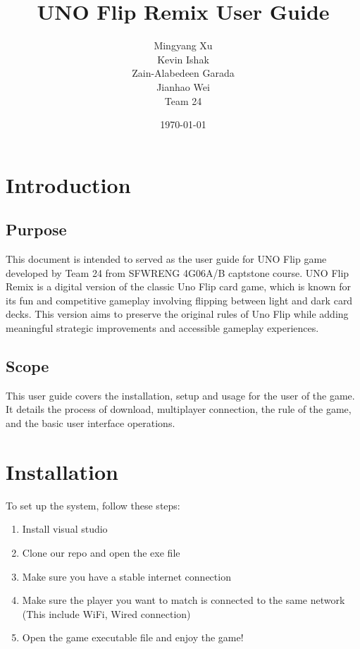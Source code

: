 \documentclass[12pt, titlepage]{article}
\begin{document}
\title{UNO Flip Remix User Guide}
\author{Mingyang Xu\\ Kevin Ishak\\ Zain-Alabedeen Garada\\ Jianhao Wei\\ Team 24}

\date{\today}

\maketitle


\tableofcontents

\listoffigures


\newpage


\section{Introduction}
\subsection{Purpose}
This document is intended to served as the user guide for UNO Flip game developed by Team 24 from SFWRENG 4G06A/B captstone course. UNO Flip Remix is a digital version of the classic Uno Flip card game, which is known for its fun and competitive gameplay involving flipping between light and dark card decks. This version aims to preserve the original rules of Uno Flip while adding meaningful strategic improvements and accessible gameplay experiences.

\subsection{Scope}
This user guide covers the installation, setup and usage for the user of the game. It details the process of download, multiplayer connection, the rule of the game, and the basic user interface operations.

\section{Installation}
To set up the system, follow these steps:
\begin{enumerate}
    \item Install visual studio
    \item Clone our repo and open the exe file 
    \item Make sure you have a stable internet connection
    \item Make sure the player you want to match is connected to the same network (This include WiFi, Wired connection)
    \item Open the game executable file and enjoy the game!
\end{enumerate}
\end{document}
